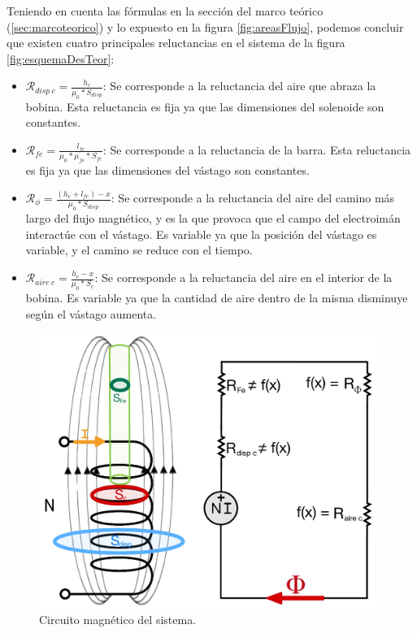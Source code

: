 Teniendo en cuenta las fórmulas en la sección del marco teórico (\ref{sec:marcoteorico}) y lo expuesto en la figura \ref{fig:areasFlujo}, podemos concluir que existen cuatro principales reluctancias en el sistema de la figura \ref{fig:esquemaDesTeor}:

\begin{itemize}
    \item \(\mathcal{R}_{disp~c}=\frac{h_c}{\mu_0*S_{disp}}\): Se corresponde a la reluctancia del aire que abraza la bobina. Esta reluctancia es fija ya que las dimensiones del solenoide son constantes.
    \item \(\mathcal{R}_{fe}=\frac{l_{fe}}{\mu_0*\mu_{fe}*S_{fe}}\): Se corresponde a la reluctancia de la barra. Esta reluctancia es fija ya que las dimensiones del vástago son constantes.
    \item \(\mathcal{R}_{\phi}=\frac{(h_c+l_{fe})-x}{\mu_0*S_{disp}}\): Se corresponde a la reluctancia del aire del camino más largo del flujo magnético, y es la que provoca que el campo del electroimán interactúe con el vástago. Es variable ya que la posición del vástago es variable, y el camino se reduce con el tiempo.
    \item \(\mathcal{R}_{aire~c}=\frac{h_c-x}{\mu_0*S_c}\): Se corresponde a la reluctancia del aire en el interior de la bobina. Es variable ya que la cantidad de aire dentro de la misma disminuye según el vástago aumenta.
\end{itemize}

\begin{figure}[H]
    \centering
    \includegraphics[width=11cm]{FigurasMemoria/circuitoMag.jpg}
    \caption{Circuito magnético del sistema.}
    \label{fig:circuitoMag} %
\end{figure}


